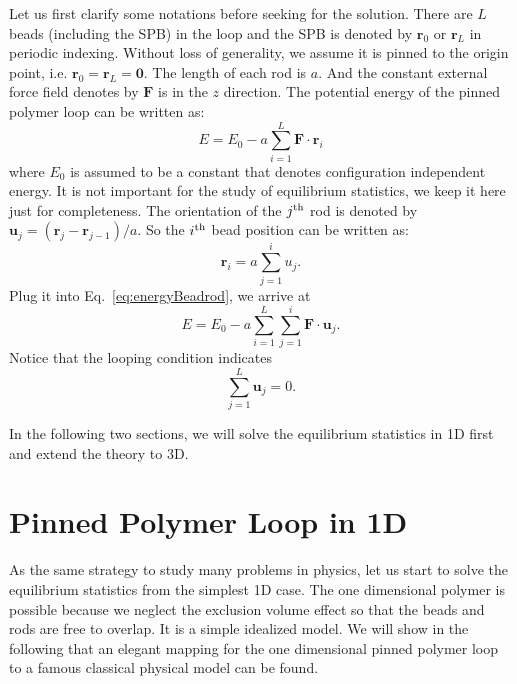 Let us first clarify some notations before seeking for the solution. There are $L$ beads (including the SPB) in the loop and the SPB is denoted by $\mathbf{r}_0$ or $\mathbf{r}_L$ in periodic indexing. Without loss of generality, we assume it is pinned to the origin point, i.e. $\mathbf{r}_0 = \mathbf{r}_L = \mathbf{0}$. The length of each rod is $a$. And the constant external force field denotes by $\mathbf{F}$ is in the $z$ direction. The potential energy of the pinned polymer loop can be written as:
\begin{equation}
    \label{eq:energyBeadrod}
    E = E_0 - a\sum_{i=1}^{L} \mathbf{F}\cdot\mathbf{r}_i
\end{equation}
where $E_0$ is assumed to be a constant that denotes configuration independent energy. It is not important for the study of equilibrium statistics, we keep it here just for completeness. The orientation of the $j^{\rm{th}}$ rod is denoted by $\mathbf{u}_j = (\mathbf{r}_{j}-\mathbf{r}_{j-1})/a$. So the $i^{\rm{th}}$ bead position can be written as:
\begin{equation}
    \label{eq:beadposRodsum}
    \mathbf{r}_i = a \sum_{j=1}^{i} {u}_j.
\end{equation}
Plug it into Eq.~\eqref{eq:energyBeadrod}, we arrive at
\begin{equation}
    \label{eq:energyRodsum}
    E = E_0-a\sum_{i=1}^{L}\sum_{j=1}^{i}\mathbf{F}\cdot\mathbf{u}_j.
\end{equation}
Notice that the looping condition indicates
\begin{equation}
    \label{eq:loopCondition}
    \sum_{j=1}^{L} \mathbf{u}_j = 0.
\end{equation}

In the following two sections, we will solve the equilibrium statistics in 1D first and extend the theory to 3D.


\section{Pinned Polymer Loop in 1D}
\label{sec:pinned_polymer_loop_in_1d}

As the same strategy to study many problems in physics, let us start to solve the equilibrium statistics from the simplest 1D case. The one dimensional polymer is possible because we neglect the exclusion volume effect so that the beads and rods are free to overlap. It is a simple idealized model. We will show in the following that an elegant mapping for the one dimensional pinned polymer loop to a famous classical physical model can be found. 

